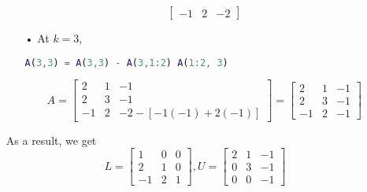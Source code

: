 \documentclass[11pt]{article}
\begin{document}
\begin{enumerate}
\begin{itemize}
$$\begin{bmatrix}
	-1& 2& -2	
\end{bmatrix}
$$
\item[•]At $k=3$,
\begin{lstlisting}[language=matlab]
A(3,3) = A(3,3) - A(3,1:2) A(1:2, 3)
\end{lstlisting}
$$A=
\begin{bmatrix}
	2& 1& -1\\
	2& 3& -1\\
	-1& 2& -2 -[-1(-1)+2(-1)]
\end{bmatrix} = 
\begin{bmatrix}
	2& 1& -1\\
	2& 3& -1\\
	-1& 2& -1
\end{bmatrix}
$$
\end{itemize}
As a result, we get $$L = \begin{bmatrix}
	1& 0& 0\\
	2& 1& 0\\
	-1& 2& 1
\end{bmatrix}, U = \begin{bmatrix}
	2& 1& -1\\
	0& 3& -1\\
	0& 0& -1
\end{bmatrix}$$


\end{enumerate}
\end{document}
